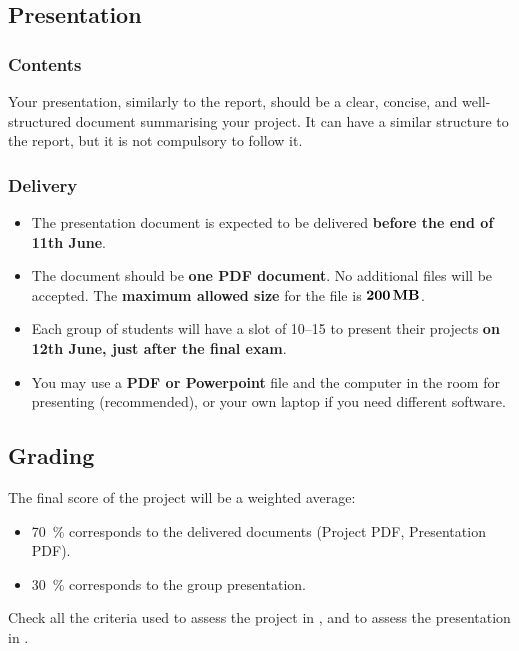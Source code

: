 \documentclass[11pt]{exam}
\begin{document}
    \subsection{Presentation}
    \label{subsec:presentation}
    \subsubsection{Contents}
    Your presentation, similarly to the report, should be a clear, concise, and well-structured document summarising your project. It can have a similar structure to the report, but it is not compulsory to follow it.

    \subsubsection{Delivery}
    \begin{itemize}
        \item The presentation document is expected to be delivered \href{https://atenea.upc.edu/mod/assign/view.php?id=4973442}{} \textbf{before the end of 11th June}.
        \item The document should be \textbf{one PDF document}. No additional files will be accepted. The \textbf{maximum allowed size} for the file is $\SI{\mathbf{200}}{\mathbf{\mega\byte}}$.
        \item Each group of students will have a slot of \SIrange{10}{15}{\min} to present their projects \textbf{on 12th June, just after the final exam}.
        \item You may use a \textbf{PDF or Powerpoint} file and the computer in the room for presenting (recommended), or your own laptop if you need different software. %
    \end{itemize}

    \subsection{Grading}
    The final score of the project will be a weighted average:
    \begin{itemize}
        \item \SI{70}{\percent} corresponds to the delivered documents (Project PDF, Presentation PDF).
        \item \SI{30}{\percent} corresponds to the group presentation.
    \end{itemize}
    Check all the criteria used to assess the project in , and to assess the presentation in .
\end{document}
